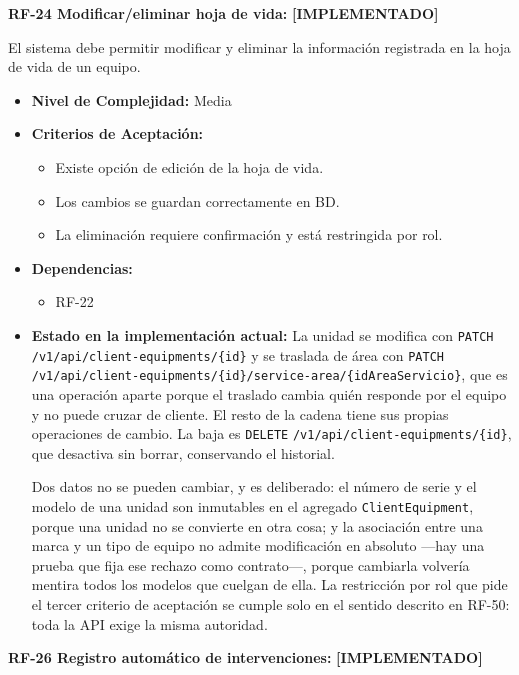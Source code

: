\documentclass[12pt,a4paper]{article}
\newcommand{\ruta}[1]{\nolinkurl{#1}}
\newcommand{\estadoImplementado}{\textcolor{mainRed}{\textbf{[IMPLEMENTADO]}}}
\begin{document}
\textbf{RF-24 Modificar/eliminar hoja de vida:} \estadoImplementado{}

El sistema debe permitir modificar y eliminar la información registrada en la hoja de vida de un equipo.

\begin{itemize}
  \item \textbf{Nivel de Complejidad:} Media

  \item \textbf{Criterios de Aceptación:}
  \begin{itemize}
    \item Existe opción de edición de la hoja de vida.
    \item Los cambios se guardan correctamente en BD.
    \item La eliminación requiere confirmación y está restringida por rol.
  \end{itemize}

  \item \textbf{Dependencias:}
  \begin{itemize}
    \item RF-22
  \end{itemize}

  \item \textbf{Estado en la implementación actual:} La unidad se modifica con \texttt{PATCH} \ruta{/v1/api/client-equipments/{id}} y se traslada de área con \texttt{PATCH} \ruta{/v1/api/client-equipments/{id}/service-area/{idAreaServicio}}, que es una operación aparte porque el traslado cambia quién responde por el equipo y no puede cruzar de cliente. El resto de la cadena tiene sus propias operaciones de cambio. La baja es \texttt{DELETE} \ruta{/v1/api/client-equipments/{id}}, que desactiva sin borrar, conservando el historial.

  Dos datos no se pueden cambiar, y es deliberado: el número de serie y el modelo de una unidad son inmutables en el agregado \texttt{ClientEquipment}, porque una unidad no se convierte en otra cosa; y la asociación entre una marca y un tipo de equipo no admite modificación en absoluto —hay una prueba que fija ese rechazo como contrato—, porque cambiarla volvería mentira todos los modelos que cuelgan de ella. La restricción por rol que pide el tercer criterio de aceptación se cumple solo en el sentido descrito en RF-50: toda la API exige la misma autoridad.
\end{itemize}

\textbf{RF-26 Registro automático de intervenciones:} \estadoImplementado{}
\end{document}
